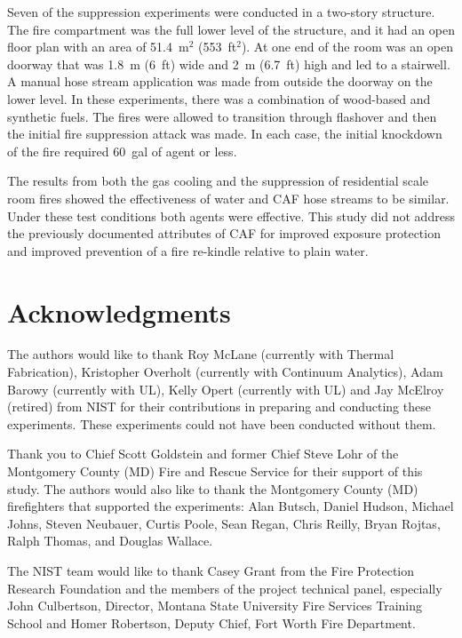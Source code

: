 \documentclass[12pt,oneside]{book}
\begin{document}
Seven of the suppression experiments were conducted in a two-story structure.  The fire compartment was the full lower level of the structure, and it had an open floor plan with an area of 51.4~m$^2$ (553~ft$^2$). At one end of the room was an open doorway that was 1.8~m (6~ft) wide and 2~m (6.7~ft) high and led to a stairwell. A manual hose stream application was made from outside the doorway on the lower level. In these experiments, there was a combination of wood-based and synthetic fuels. The fires were allowed to transition through flashover and then the initial fire suppression attack was made. In each case, the initial knockdown of the fire required 60~gal of agent or less.   

The results from both the gas cooling and the suppression of residential scale room fires showed the effectiveness of water and CAF hose streams to be similar. Under these test conditions both agents were effective. This study did not address the previously documented attributes of CAF for improved exposure protection and improved prevention of a fire re-kindle relative to plain water. 


\chapter{Acknowledgments}
\label{chap:acknowledgments}

The authors would like to thank Roy McLane (currently with Thermal Fabrication), Kristopher Overholt (currently with Continuum Analytics), Adam Barowy (currently with UL), Kelly Opert (currently with UL) and Jay McElroy (retired) from NIST for their contributions in preparing and conducting these experiments. These experiments could not have been conducted without them. 

Thank you to Chief Scott Goldstein and former Chief Steve Lohr of the Montgomery County (MD) Fire and Rescue Service for their support of this study. The authors would also like to thank the Montgomery County (MD) firefighters that supported the experiments: Alan Butsch, Daniel Hudson, Michael Johns, Steven Neubauer, Curtis Poole, Sean Regan, Chris Reilly, Bryan Rojtas, Ralph Thomas, and Douglas Wallace. 

The NIST team would like to thank Casey Grant from the Fire Protection Research Foundation and the members of the project technical panel, especially John Culbertson, Director, Montana State University Fire Services Training School and Homer Robertson, Deputy Chief, Fort Worth Fire Department.  
\end{document}
